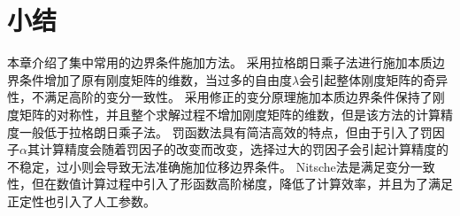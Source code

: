 \section{小结}
本章介绍了集中常用的边界条件施加方法。
采用拉格朗日乘子法进行施加本质边界条件增加了原有刚度矩阵的维数，当过多的自由度$\lambda$会引起整体刚度矩阵的奇异性，不满足高阶的变分一致性。
采用修正的变分原理施加本质边界条件保持了刚度矩阵的对称性，并且整个求解过程不增加刚度矩阵的维数，但是该方法的计算精度一般低于拉格朗日乘子法。
罚函数法具有简洁高效的特点，但由于引入了罚因子$\alpha$其计算精度会随着罚因子的改变而改变，选择过大的罚因子会引起计算精度的不稳定，过小则会导致无法准确施加位移边界条件。
Nitsche法是满足变分一致性，但在数值计算过程中引入了形函数高阶梯度，降低了计算效率，并且为了满足正定性也引入了人工参数。


